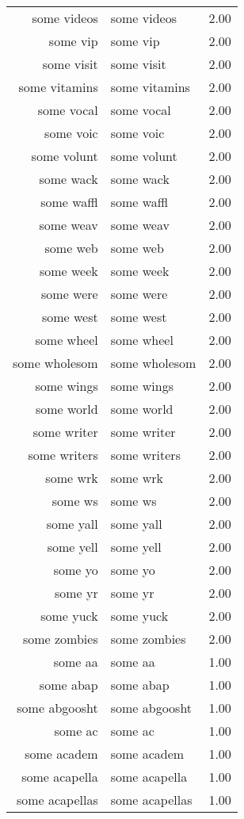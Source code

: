 \begin{table}[ht]
\begin{tabular}{rlr}
  some videos & some videos & 2.00 \\ 
  some vip & some vip & 2.00 \\ 
  some visit & some visit & 2.00 \\ 
  some vitamins & some vitamins & 2.00 \\ 
  some vocal & some vocal & 2.00 \\ 
  some voic & some voic & 2.00 \\ 
  some volunt & some volunt & 2.00 \\ 
  some wack & some wack & 2.00 \\ 
  some waffl & some waffl & 2.00 \\ 
  some weav & some weav & 2.00 \\ 
  some web & some web & 2.00 \\ 
  some week & some week & 2.00 \\ 
  some were & some were & 2.00 \\ 
  some west & some west & 2.00 \\ 
  some wheel & some wheel & 2.00 \\ 
  some wholesom & some wholesom & 2.00 \\ 
  some wings & some wings & 2.00 \\ 
  some world & some world & 2.00 \\ 
  some writer & some writer & 2.00 \\ 
  some writers & some writers & 2.00 \\ 
  some wrk & some wrk & 2.00 \\ 
  some ws & some ws & 2.00 \\ 
  some yall & some yall & 2.00 \\ 
  some yell & some yell & 2.00 \\ 
  some yo & some yo & 2.00 \\ 
  some yr & some yr & 2.00 \\ 
  some yuck & some yuck & 2.00 \\ 
  some zombies & some zombies & 2.00 \\ 
  some aa & some aa & 1.00 \\ 
  some abap & some abap & 1.00 \\ 
  some abgoosht & some abgoosht & 1.00 \\ 
  some ac & some ac & 1.00 \\ 
  some academ & some academ & 1.00 \\ 
  some acapella & some acapella & 1.00 \\ 
  some acapellas & some acapellas & 1.00 \\ 

\end{tabular}
\end{table}
